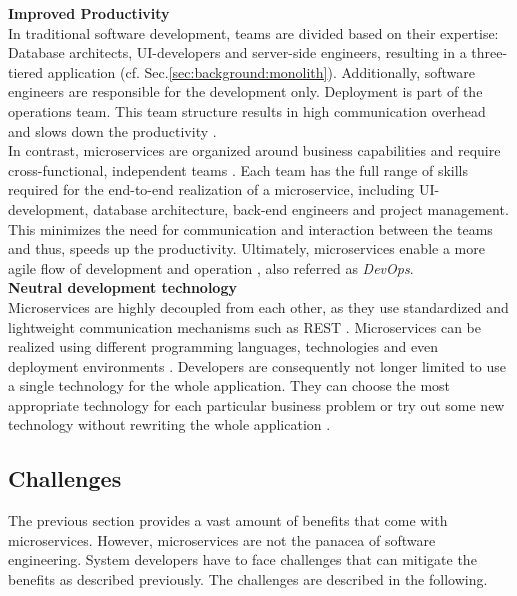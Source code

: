 \noindent
\textbf{Improved Productivity} \\
In traditional software development, teams are divided based on their expertise: Database architects, UI-developers and server-side engineers, resulting in a three-tiered application (cf. Sec.\ref{sec:background:monolith}). Additionally, software engineers are responsible for the development only. Deployment is part of the operations team. This team structure results in high communication overhead and slows down the productivity \cite{Mazlami}. \\
In contrast, microservices are organized around business capabilities and require cross-functional, independent teams \cite{ObjectAwareAmiri}. Each team has the full range of skills required for the end-to-end realization of a microservice, including UI-development, database architecture, back-end engineers and project management. 
This minimizes the need for communication and interaction between the teams and thus, speeds up the productivity. Ultimately, microservices enable a more agile flow of development and operation \cite{ClassificationOfRefactoring}, also referred as \textit{DevOps}. 
\\


\noindent
\textbf{Neutral development technology} \\
Microservices are highly decoupled from each other, as they use standardized and lightweight communication mechanisms such as REST \cite{FunctionalDecompositionHeinrich}. Microservices can be realized using different programming languages, technologies and even deployment environments \cite{DataflowDrivenChen}. Developers are consequently not longer limited to use a single technology for the whole application. They can choose the most appropriate technology for each particular business problem or try out some new technology without rewriting the whole application \cite{ServiceCutter} \cite{TowardsTechnique}. 
 



\subsection{Challenges}
The previous section provides a vast amount of benefits that come with microservices. However, microservices are not the panacea of software engineering. System developers have to face challenges that can mitigate the benefits as described previously. The challenges are described in the following. \\ 

